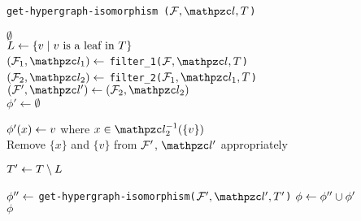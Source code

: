 \begin{algorithm}[h]
  \caption{{\tt get-hypergraph-isomorphism ($\cF, \cl, T$)}}
  \label{al:icppl-find-isomorph}
  \begin{algorithmic}[\lndisplay]

    \RETURN $\emptyset$\\
    \ENDIF
    \STATE $L \leftarrow \{v \mid v \text{ is a leaf in }      T\}$\\
    \STATE $(\cF_1, \cl_1) \assign$ {\tt filter\_1($\cF, \cl,
      T$)}\\
    \STATE $(\cF_2, \cl_2) \assign$ {\tt filter\_2($\cF_1,
      \cl_1, T$)}\\

    \STATE $(\cF', \cl') \assign (\cF_2, \cl_2)$\\
    \STATE $\phi' \leftarrow \emptyset$

     \STATE $\phi'(x) \leftarrow v$ where $x \in
    \cl_2^{-1}(\{v\})$ \\
    \STATE Remove $\{x\}$ and $\{v\}$ from ${\cal F}'$, $\cl'$  appropriately\\
    \ENDFOR

    \STATE $T' \leftarrow T \setminus L$

    \STATE $\phi'' \leftarrow$ {\tt get-hypergraph-isomorphism($\cF',
      \cl', T'$)}
    \STATE $\phi \leftarrow \phi'' \cup \phi'$ \\
    \RETURN $\phi$
  \end{algorithmic}
\end{algorithm}


